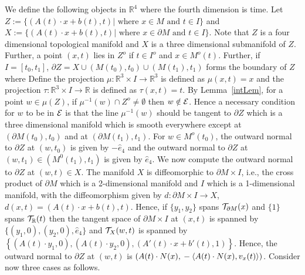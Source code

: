 \documentclass{elsart5p}
\newcommand{\eat}[1]{}
\begin{document}
{ We define the following objects in $\mathbb{R}^4$ where the fourth dimension is time.
Let $Z := \{ (A(t) \cdot x + b(t) , t) | \mbox{ where } x \in M \mbox{ and } t \in I \}$ and
$X := \{ (A(t) \cdot x + b(t) , t) | \mbox{ where } x \in \partial M \mbox{ and } t \in I \} $.
Note that $Z$ is a four dimensional topological manifold and $X$ is a three dimensional
submanifold of $Z$. Further, a point $(x,t)$ lies in $Z^o$ if $t \in I^o$ and $x \in M^o(t)$.  
Further, if $I = [t_0, t_1]$, $\partial Z = X \cup (M(t_0), t_0) \cup (M(t_1), t_1)$ 
forms the boundary of $Z$ where Define the 
projection $\mu: \mathbb{R}^3 \times I \to \mathbb{R}^3$ is defined as $\mu(x,t) = x$ and 
the projection $\tau: \mathbb{R}^3 \times I \to \mathbb{R}$ is defined as $\tau(x,t) = t$.
By Lemma~\ref{intLem}, for a point 
$w \in \mu(Z)$, if $\mu^{-1}(w) \cap Z^o \neq \emptyset$ then $w \notin {\cal E}$.  Hence a necessary 
condition for $w$ to be in ${\cal E}$ is that the line $\mu^{-1}(w)$ should be tangent to $\partial Z$
which is a three dimensional manifold which is smooth everywhere except at 
$(\partial M(t_0), t_0)$ and at $(\partial M(t_1), t_1)$. 
For $w \in M^o(t_0)$, \eat{ ${\cal T}_{(M^o(0),0)}(w,0)$ is spanned by $\left \{ \hat{e}_1, 
\hat{e}_2, \hat{e}_3 \right \}$.  Hence }
the outward normal to $\partial Z$ at $(w,t_0)$ is given by $-\hat{e}_4$ and  
the outward normal to $\partial Z$ at $(w,t_1) \in (M^0(t_1),t_1)$ is given by $\hat{e}_4$.
We now compute the outward normal to $\partial Z$ at $(w,t) \in X$.
The manifold $X$ is diffeomorphic to $\partial M \times I$, i.e., the cross product of $\partial M$ 
which is a 2-dimensional manifold and $I$ which is a 1-dimensional manifold, with the 
diffeomorphism given by $d: \partial M \times I \to X$, $d(x,t) = (A(t) \cdot x+b(t), t)$.  
Hence, if $\{y_1, y_2 \}$ spans ${\cal T}_{\partial M}(x)$  and $\{1\}$ spans ${\cal T}_{\mathbb{R}}(t)$ 
then the tangent space of $\partial M \times I$ at $(x,t)$ is spanned by 
$\{(y_1, 0), (y_2, 0), \hat{e}_4 \}$ and ${\cal T}_{X}(w,t)$ is spanned by \\
 $\left \{ (A(t) \cdot y_1 , 0),  (A(t) \cdot y_2 , 0),  (A'(t)  \cdot x + b'(t),  1) \right \}$.
Hence, the outward normal to $\partial Z$ at $(w,t)$ is 
$( A(t) \cdot N(x) , \\ - \left < A(t) \cdot N(x) ,v_x(t)  \right >)$.
Consider now three cases as follows.

}
\end{document}
